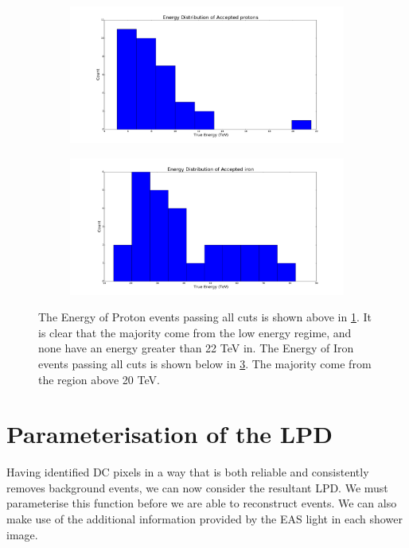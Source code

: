 \documentclass[11pt]{article}
\begin{document}
\begin{figure}
	\centering
	\begin{subfigure}[b]{0.9\textwidth}
		\centering
		\includegraphics[width=\textwidth]{energyfullprotons}
		\caption{}
		\label{fig:protonenergy}
	\end{subfigure}
	\begin{subfigure}[b]{0.9\textwidth}
		\centering
		\includegraphics[width=\textwidth]{energyfulliron}
		\caption{}
		\label{fig:ironenergy}
	\end{subfigure}
	\caption{The Energy of Proton events passing all cuts is shown above in \ref{fig:protonenergy}. It is clear that the majority come from the low energy regime, and none have an energy greater than 22 TeV in. The Energy of Iron events passing all cuts is shown below in \ref{fig:ironenergy}. The majority come from the region above 20 TeV.}
\end{figure} 

\section{Parameterisation of the LPD}
Having identified DC pixels in a way that is both reliable and consistently removes background events, we can now consider the resultant LPD. We must parameterise this function before we are able to reconstruct events. We can also make use of the additional information provided by the EAS light in each shower image.
\end{document}
